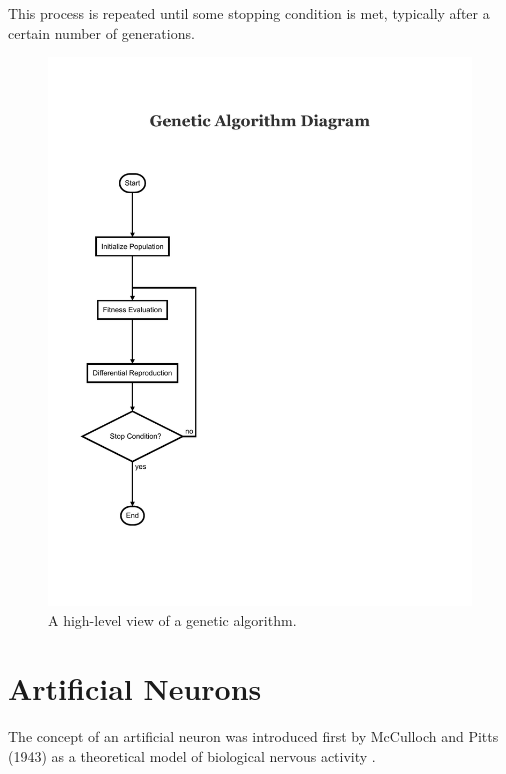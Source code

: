 \documentclass[master]{outhesis}
\begin{document}
This process is repeated until some stopping condition is met, typically after a certain number of generations.

\begin{figure}[H]
	\centering
	\includegraphics{GeneticAlgorithm.pdf}
	\caption{A high-level view of a genetic algorithm.}
\end{figure}

\section{Artificial Neurons}


The concept of an artificial neuron was introduced first by McCulloch and Pitts (1943) as a theoretical model of biological nervous activity \cite{McCulloch:1943aa}.
\end{document}
